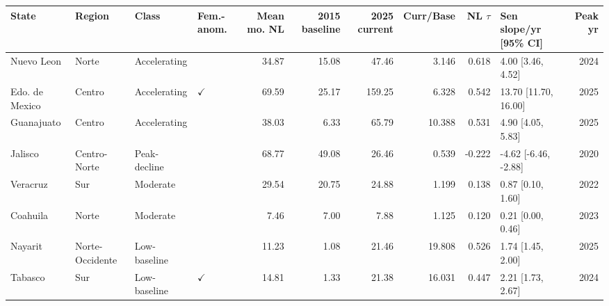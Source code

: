 \begin{tabular}{llllrrrrrlr}
\toprule
State & Region & Class & Fem.-anom. & Mean mo. NL & 2015 baseline & 2025 current & Curr/Base & NL $\tau$ & Sen slope/yr [95\% CI] & Peak yr \\
\midrule
Nuevo Leon & Norte & Accelerating &  & 34.87 & 15.08 & 47.46 & 3.146 & 0.618 & 4.00 [3.46, 4.52] & 2024 \\
Edo. de Mexico & Centro & Accelerating & $\checkmark$ & 69.59 & 25.17 & 159.25 & 6.328 & 0.542 & 13.70 [11.70, 16.00] & 2025 \\
Guanajuato & Centro & Accelerating &  & 38.03 & 6.33 & 65.79 & 10.388 & 0.531 & 4.90 [4.05, 5.83] & 2025 \\
Jalisco & Centro-Norte & Peak-decline &  & 68.77 & 49.08 & 26.46 & 0.539 & -0.222 & -4.62 [-6.46, -2.88] & 2020 \\
Veracruz & Sur & Moderate &  & 29.54 & 20.75 & 24.88 & 1.199 & 0.138 & 0.87 [0.10, 1.60] & 2022 \\
Coahuila & Norte & Moderate &  & 7.46 & 7.00 & 7.88 & 1.125 & 0.120 & 0.21 [0.00, 0.46] & 2023 \\
Nayarit & Norte-Occidente & Low-baseline &  & 11.23 & 1.08 & 21.46 & 19.808 & 0.526 & 1.74 [1.45, 2.00] & 2025 \\
Tabasco & Sur & Low-baseline & $\checkmark$ & 14.81 & 1.33 & 21.38 & 16.031 & 0.447 & 2.21 [1.73, 2.67] & 2024 \\
\bottomrule
\end{tabular}
